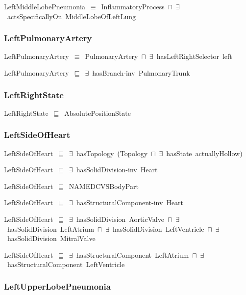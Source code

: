 \documentclass{article}
\begin{document}
LeftMiddleLobePneumonia~\ensuremath{\equiv}~InflammatoryProcess~\ensuremath{\sqcap}~\ensuremath{\exists}~actsSpecificallyOn~MiddleLobeOfLeftLung

\subsubsection*{LeftPulmonaryArtery}

LeftPulmonaryArtery~\ensuremath{\equiv}~PulmonaryArtery~\ensuremath{\sqcap}~\ensuremath{\exists}~hasLeftRightSelector~left

LeftPulmonaryArtery~\ensuremath{\sqsubseteq}~\ensuremath{\exists}~hasBranch-inv~PulmonaryTrunk~

\subsubsection*{LeftRightState}

LeftRightState~\ensuremath{\sqsubseteq}~AbsolutePositionState~

\subsubsection*{LeftSideOfHeart}

LeftSideOfHeart~\ensuremath{\sqsubseteq}~\ensuremath{\exists}~hasTopology~(Topology~\ensuremath{\sqcap}~\ensuremath{\exists}~hasState~actuallyHollow)~

LeftSideOfHeart~\ensuremath{\sqsubseteq}~\ensuremath{\exists}~hasSolidDivision-inv~Heart~

LeftSideOfHeart~\ensuremath{\sqsubseteq}~NAMEDCVSBodyPart~

LeftSideOfHeart~\ensuremath{\sqsubseteq}~\ensuremath{\exists}~hasStructuralComponent-inv~Heart~

LeftSideOfHeart~\ensuremath{\sqsubseteq}~\ensuremath{\exists}~hasSolidDivision~AorticValve~\ensuremath{\sqcap}~\ensuremath{\exists}~hasSolidDivision~LeftAtrium~\ensuremath{\sqcap}~\ensuremath{\exists}~hasSolidDivision~LeftVentricle~\ensuremath{\sqcap}~\ensuremath{\exists}~hasSolidDivision~MitralValve~

LeftSideOfHeart~\ensuremath{\sqsubseteq}~\ensuremath{\exists}~hasStructuralComponent~LeftAtrium~\ensuremath{\sqcap}~\ensuremath{\exists}~hasStructuralComponent~LeftVentricle~

\subsubsection*{LeftUpperLobePneumonia}
\end{document}
